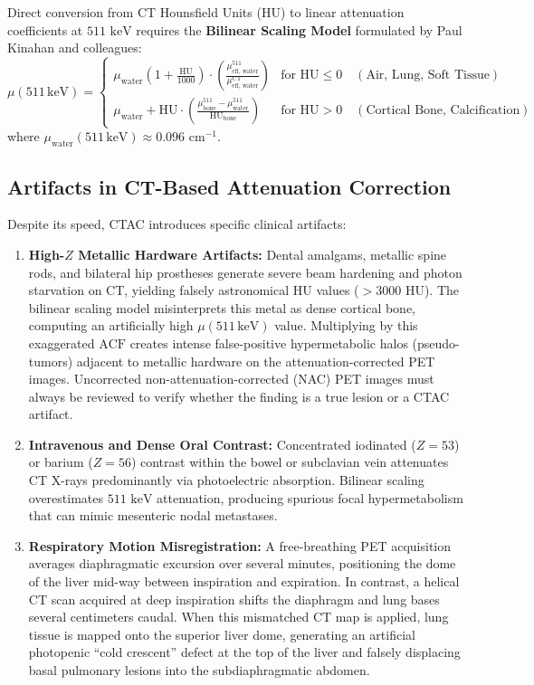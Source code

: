 \documentclass[11pt,a4paper]{article}
\begin{document}
Direct conversion from CT Hounsfield Units ($\text{HU}$) to linear attenuation coefficients at $511\text{ keV}$ requires the \textbf{Bilinear Scaling Model} formulated by Paul Kinahan and colleagues:
\begin{equation}
    \mu(511\,\text{keV}) = 
    \begin{cases} 
      \mu_{\text{water}} \left( 1 + \frac{\text{HU}}{1000} \right) \cdot \left(\frac{\mu_{\text{eff, water}}^{511}}{\mu_{\text{eff, water}}^{\text{CT}}}\right) & \text{for } \text{HU} \le 0 \quad (\text{Air, Lung, Soft Tissue}) \\[1em]
      \mu_{\text{water}} + \text{HU} \cdot \left( \frac{\mu_{\text{bone}}^{511} - \mu_{\text{water}}^{511}}{\text{HU}_{\text{bone}}} \right) & \text{for } \text{HU} > 0 \quad (\text{Cortical Bone, Calcification})
   \end{cases}
\end{equation}
where $\mu_{\text{water}}(511\,\text{keV}) \approx 0.096\text{ cm}^{-1}$.

\subsection{Artifacts in CT-Based Attenuation Correction}
Despite its speed, CTAC introduces specific clinical artifacts:
\begin{enumerate}[leftmargin=2em]
    \item \textbf{High-$Z$ Metallic Hardware Artifacts:} Dental amalgams, metallic spine rods, and bilateral hip prostheses generate severe beam hardening and photon starvation on CT, yielding falsely astronomical $\text{HU}$ values ($> 3000\text{ HU}$). The bilinear scaling model misinterprets this metal as dense cortical bone, computing an artificially high $\mu(511\,\text{keV})$ value. Multiplying by this exaggerated $\text{ACF}$ creates intense false-positive hypermetabolic halos (pseudo-tumors) adjacent to metallic hardware on the attenuation-corrected PET images. Uncorrected non-attenuation-corrected (NAC) PET images must always be reviewed to verify whether the finding is a true lesion or a CTAC artifact.
    \item \textbf{Intravenous and Dense Oral Contrast:} Concentrated iodinated ($Z=53$) or barium ($Z=56$) contrast within the bowel or subclavian vein attenuates CT X-rays predominantly via photoelectric absorption. Bilinear scaling overestimates $511\text{ keV}$ attenuation, producing spurious focal hypermetabolism that can mimic mesenteric nodal metastases.
    \item \textbf{Respiratory Motion Misregistration:} A free-breathing PET acquisition averages diaphragmatic excursion over several minutes, positioning the dome of the liver mid-way between inspiration and expiration. In contrast, a helical CT scan acquired at deep inspiration shifts the diaphragm and lung bases several centimeters caudal. When this mismatched CT map is applied, lung tissue is mapped onto the superior liver dome, generating an artificial photopenic ``cold crescent'' defect at the top of the liver and falsely displacing basal pulmonary lesions into the subdiaphragmatic abdomen.
\end{enumerate}
\end{document}
